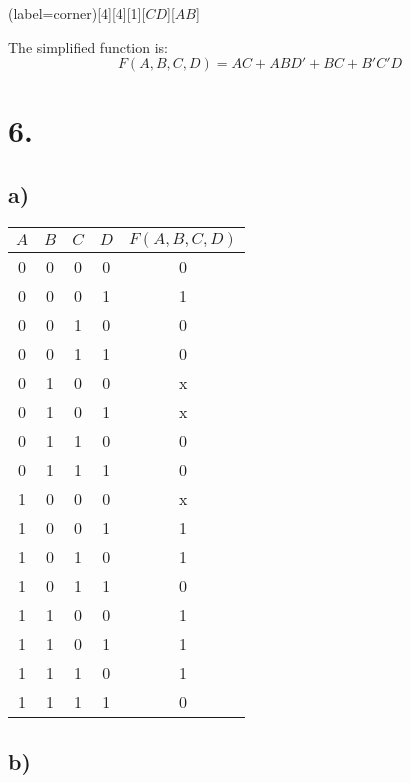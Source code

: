 \documentclass[a4paper,12pt]{article}
\begin{document}
\begin{center}
	\begin{karnaugh-map}(label=corner)[4][4][1][$CD$][$AB$]
		\autoterms[1]
	\end{karnaugh-map}
\end{center}

The simplified function is:
\begin{equation*}
	\boxed{F(A,B,C,D) = AC + ABD' + BC + B'C'D}
\end{equation*}

\section*{6.}

\subsection*{a)}

\begin{center}
	\begin{tabular}{ccccc}
		\toprule
		$A$ & $B$ & $C$ & $D$ & $F(A,B,C,D)$ \\
		\midrule
		0 & 0 & 0 & 0 & 0 \\
		0 & 0 & 0 & 1 & 1 \\
		0 & 0 & 1 & 0 & 0 \\
		0 & 0 & 1 & 1 & 0 \\
		0 & 1 & 0 & 0 & x \\
		0 & 1 & 0 & 1 & x \\
		0 & 1 & 1 & 0 & 0 \\
		0 & 1 & 1 & 1 & 0 \\
		1 & 0 & 0 & 0 & x \\
		1 & 0 & 0 & 1 & 1 \\
		1 & 0 & 1 & 0 & 1 \\
		1 & 0 & 1 & 1 & 0 \\
		1 & 1 & 0 & 0 & 1 \\
		1 & 1 & 0 & 1 & 1 \\
		1 & 1 & 1 & 0 & 1 \\
		1 & 1 & 1 & 1 & 0 \\
		\bottomrule
	\end{tabular}
\end{center}

\subsection*{b)}
\end{document}
